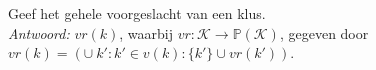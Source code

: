 
\item Geef het gehele voorgeslacht van een klus. \\


\emph{Antwoord:} $vr(k)$, waarbij $vr: \mathcal{K} \rightarrow \mathbb{P}(\mathcal{K})$, gegeven door $vr(k) = (\cup ~ k' : k' \in v(k) : \{k'\} \cup vr(k'))$. \\


